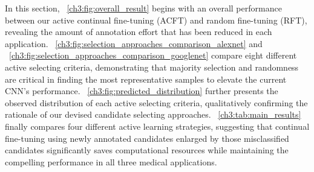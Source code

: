 In this section, \figurename~\ref{ch3:fig:overall_result} begins with an overall performance between our active continual fine-tuning (ACFT) and random fine-tuning (RFT), revealing the amount of annotation effort that has been reduced in each application. \figurename~\ref{ch3:fig:selection_approaches_comparison_alexnet} and \figurename~\ref{ch3:fig:selection_approaches_comparison_googlenet} compare eight different active selecting criteria, demonstrating that majority selection and randomness are critical in finding the most representative samples to elevate the current CNN's performance.
\figurename~\ref{ch3:fig:predicted_distribution} further presents the observed distribution of each active selecting criteria, qualitatively confirming the rationale of our devised candidate selecting approaches.
\tableautorefname~\ref{ch3:tab:main_results} finally compares four different active learning strategies, suggesting that continual fine-tuning using newly annotated candidates enlarged by those misclassified candidates significantly saves computational resources while maintaining the compelling performance in all three medical applications.

